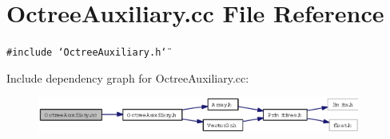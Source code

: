 \section{Octree\-Auxiliary.cc File Reference}
\label{OctreeAuxiliary_8cc}
{\tt \#include \char`\"{}Octree\-Auxiliary.h\char`\"{}}\par


Include dependency graph for Octree\-Auxiliary.cc:\begin{figure}[H]
\begin{center}
\leavevmode
\includegraphics[width=300pt]{OctreeAuxiliary_8cc__incl}
\end{center}
\end{figure}
